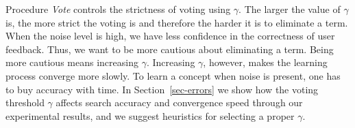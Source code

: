 Procedure {\it Vote} controls the strictness of voting using
$\gamma$.  The larger the value of $\gamma$ is, the more strict the
voting is and therefore the harder it is to eliminate a term.
When the noise level is high, we have less confidence in the correctness
of user feedback. Thus, we want to be more cautious 
about eliminating a term.
Being more cautious means increasing $\gamma$.
Increasing $\gamma$, however, makes the learning process
converge more slowly.  To learn a concept when noise is present,
one has to buy accuracy with time.  
In Section~\ref{sec-errors} we show how the voting threshold $\gamma$ affects
search accuracy and convergence speed through our experimental results,
and we suggest heuristics for selecting a proper $\gamma$.

